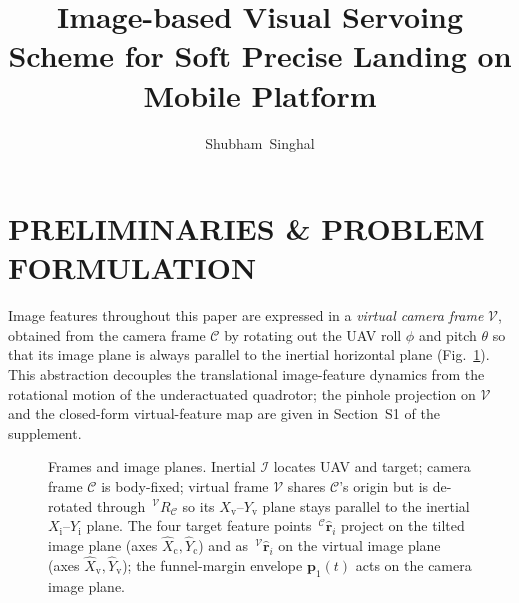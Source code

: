 
% 

\title{Image-based Visual Servoing Scheme for Soft Precise Landing on Mobile Platform}

\author{Shubham~Singhal}


\maketitle

\section{PRELIMINARIES \& PROBLEM FORMULATION} \label{background: section}
Image features throughout this paper are expressed in a \emph{virtual camera frame} $\mathcal{V}$, obtained from the camera frame $\mathcal{C}$ by rotating out the UAV roll $\phi$ and pitch $\theta$ so that its image plane is always parallel to the inertial horizontal plane (Fig.~\ref{frames planes: figure}). This abstraction \cite{fink2017, xie2016_2} decouples the translational image-feature dynamics from the rotational motion of the underactuated quadrotor; the pinhole projection on $\mathcal{V}$ and the closed-form virtual-feature map are given in Section~S1 of the supplement.

\begin{figure}[!t]
\centering
    \resizebox{\columnwidth}{!}{}
    \caption{Frames and image planes. Inertial $\mathcal{I}$ locates UAV and target; camera frame $\mathcal{C}$ is body-fixed; virtual frame $\mathcal{V}$ shares $\mathcal{C}$'s origin but is de-rotated through $\,^\mathcal{V}R_\mathcal{C}$ so its $X_\text{v}$--$Y_\text{v}$ plane stays parallel to the inertial $X_\text{i}$--$Y_\text{i}$ plane. The four target feature points $\,^\mathcal{C}\boldsymbol{\hat{r}}_i$ project on the tilted image plane (axes $\hat{X}_\text{c},\hat{Y}_\text{c}$) and as $\,^\mathcal{V}\boldsymbol{\hat{r}}_i$ on the virtual image plane (axes $\hat{X}_\text{v},\hat{Y}_\text{v}$); the funnel-margin envelope $\boldsymbol{p}_1(t)$ acts on the camera image plane.}
    \label{frames planes: figure}
\end{figure}

